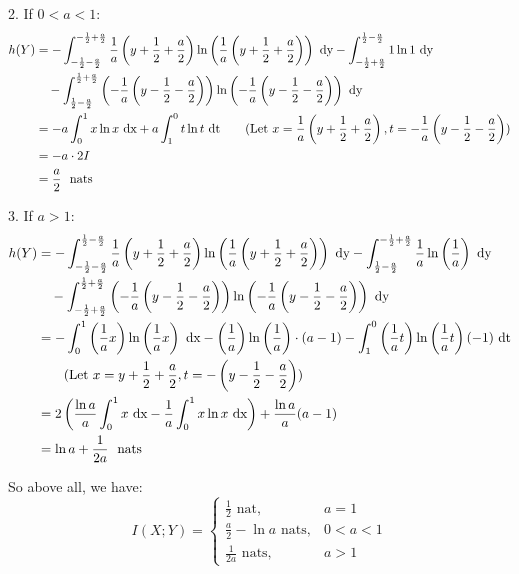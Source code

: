 2. If $0<a<1$:
\begin{align*}
h(Y) &= -\int_{-\frac{1}{2}-\frac{a}{2}}^{-\frac{1}{2}+\frac{a}{2}}\dfrac{1}{a}\left(y+\frac{1}{2}+\frac{a}{2}\right)\ln\left(\dfrac{1}{a}\left(y+\frac{1}{2}+\frac{a}{2}\right)\right) {\ \text{dy}} - \int_{-\frac{1}{2}+\frac{a}{2}}^{\frac{1}{2}-\frac{a}{2}}1 \ln 1 {\ \text{dy}} \\
&\quad - \int_{\frac{1}{2}-\frac{a}{2}}^{\frac{1}{2}+\frac{a}{2}} \left(-\dfrac{1}{a}\left(y-\frac{1}{2}-\frac{a}{2}\right)\right)\ln\left(-\dfrac{1}{a}\left(y-\frac{1}{2}-\frac{a}{2}\right)\right) {\ \text{dy}} \\
&= -a\int_{0}^{1}x\ln x {\ \text{dx}} + a\int_{1}^{0}t\ln t{\ \text{dt}} \qquad \text{(Let $x=\dfrac{1}{a}\left(y+\frac{1}{2}+\frac{a}{2}\right), t=-\dfrac{1}{a}\left(y-\frac{1}{2}-\frac{a}{2}\right)$)} \\
&= -a\cdot 2I \\
&= \dfrac{a}{2} \ \ \text{nats}
\end{align*}

3. If $a>1$:
\begin{align*}
h(Y) &= -\int_{-\frac{1}{2}-\frac{a}{2}}^{\frac{1}{2}-\frac{a}{2}}\dfrac{1}{a}\left(y+\frac{1}{2}+\frac{a}{2}\right)\ln\left(\dfrac{1}{a}\left(y+\frac{1}{2}+\frac{a}{2}\right)\right) {\ \text{dy}} - \int_{\frac{1}{2}-\frac{a}{2}}^{-\frac{1}{2}+\frac{a}{2}}\dfrac{1}{a}\ln\left(\dfrac{1}{a}\right) {\ \text{dy}} \\
&\quad - \int_{-\frac{1}{2}+\frac{a}{2}}^{\frac{1}{2}+\frac{a}{2}} \left(-\dfrac{1}{a}\left(y-\frac{1}{2}-\frac{a}{2}\right)\right)\ln\left(-\dfrac{1}{a}\left(y-\frac{1}{2}-\frac{a}{2}\right)\right) {\ \text{dy}} \\
&= -\int_{0}^{1}\left(\dfrac{1}{a}x\right)\ln \left(\dfrac{1}{a}x\right) {\ \text{dx}} - \left(\dfrac{1}{a}\right)\ln \left(\dfrac{1}{a}\right)\cdot (a-1) - \int_{1}^{0}\left(\dfrac{1}{a}t\right)\ln \left(\dfrac{1}{a}t\right)(-1){\ \text{dt}} \\
&\qquad (\text{Let } x=y+\frac{1}{2}+\frac{a}{2}, t=-\left(y-\frac{1}{2}-\frac{a}{2}\right)) \\
&= 2\left(\dfrac{\ln a}{a}\int_0^1 x {\ \text{dx}} - \dfrac{1}{a}\int_0^1 x\ln x {\ \text{dx}}\right) + \dfrac{\ln a}{a}(a-1) \\
&= \ln a + \dfrac{1}{2a} \ \ \text{nats}
\end{align*}

So above all, we have:
$$I(X;Y) = \begin{cases}
\frac{1}{2} \text{ nat}, & a=1 \\
\frac{a}{2}-\ln a \text{ nats}, & 0<a<1 \\
\frac{1}{2a} \text{ nats}, & a>1
\end{cases}$$


